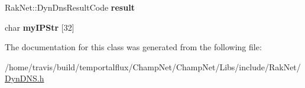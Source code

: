 \begin{DoxyCompactItemize}
\item 
\hypertarget{class_rak_net_1_1_dyn_d_n_s_a780505d5319268d8a9dc83fcd53e76a5}{Rak\-Net\-::\-Dyn\-Dns\-Result\-Code {\bfseries result}}\label{class_rak_net_1_1_dyn_d_n_s_a780505d5319268d8a9dc83fcd53e76a5}

\item 
\hypertarget{class_rak_net_1_1_dyn_d_n_s_a4cc8daf80fa95f3c3d0f181366a415cd}{char {\bfseries my\-I\-P\-Str} \mbox{[}32\mbox{]}}\label{class_rak_net_1_1_dyn_d_n_s_a4cc8daf80fa95f3c3d0f181366a415cd}

\end{DoxyCompactItemize}


The documentation for this class was generated from the following file\-:\begin{DoxyCompactItemize}
\item 
/home/travis/build/temportalflux/\-Champ\-Net/\-Champ\-Net/\-Libs/include/\-Rak\-Net/\hyperlink{_dyn_d_n_s_8h}{Dyn\-D\-N\-S.\-h}\end{DoxyCompactItemize}
